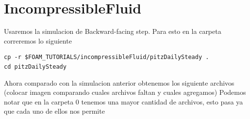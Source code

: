 \section{IncompressibleFluid}
Usaremos la simulacion de Backward-facing step. Para esto en la carpeta correremos lo siguiente
\begin{verbatim}
cp -r $FOAM_TUTORIALS/incompressibleFluid/pitzDailySteady .
cd pitzDailySteady
\end{verbatim}

Ahora comparado con la simulacion anterior obtenemos los siguiente archivos
(colocar imagen comparando cuales archivos faltan y cuales agregamos)
Podemos notar que en la carpeta 0 tenemos una mayor cantidad de archivos, esto pasa ya que cada uno de ellos nos permite
